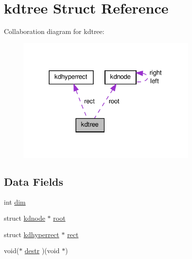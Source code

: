 \hypertarget{a00011}{\section{kdtree \-Struct \-Reference}
\label{da/d45/a00011}
}


\-Collaboration diagram for kdtree\-:\nopagebreak
\begin{figure}[H]
\begin{center}
\leavevmode
\includegraphics[width=254pt]{db/d3a/a00040}
\end{center}
\end{figure}
\subsection*{\-Data \-Fields}
\begin{DoxyCompactItemize}
\item 
int \hyperlink{a00011_a70b5e28b5bc3d1b63a7435c5fe50b837_a70b5e28b5bc3d1b63a7435c5fe50b837}{dim}
\item 
struct \hyperlink{a00009}{kdnode} $\ast$ \hyperlink{a00011_a75f7244d061840423e44a33990f08d07_a75f7244d061840423e44a33990f08d07}{root}
\item 
struct \hyperlink{a00008}{kdhyperrect} $\ast$ \hyperlink{a00011_aa40b9a36013f3e2014bd44fb27909ca2_aa40b9a36013f3e2014bd44fb27909ca2}{rect}
\item 
void($\ast$ \hyperlink{a00011_a7d06069e4fb5ffe40d5db88c0081f3ac_a7d06069e4fb5ffe40d5db88c0081f3ac}{destr} )(void $\ast$)
\end{DoxyCompactItemize}


